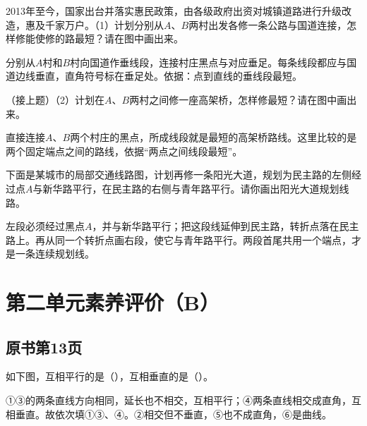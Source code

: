 2013年至今，国家出台并落实惠民政策，由各级政府出资对城镇道路进行升级改造，惠及千家万户。（1）计划分别从\(A\)、\(B\)两村出发各修一条公路与国道连接，怎样修能使修的路最短？请在图中画出来。\par
{}
\begin{BookAnswer}
分别从\(A\)村和\(B\)村向国道作垂线段，连接村庄黑点与对应垂足。每条线段都应与国道边线垂直，直角符号标在垂足处。依据：点到直线的垂线段最短。
\end{BookAnswer}

（接上题）（2）计划在\(A\)、\(B\)两村之间修一座高架桥，怎样修最短？请在图中画出来。\par
{}
\begin{BookAnswer}
直接连接\(A\)、\(B\)两个村庄的黑点，所成线段就是最短的高架桥路线。这里比较的是两个固定端点之间的路线，依据“两点之间线段最短”。
\end{BookAnswer}

下面是某城市的局部交通线路图，计划再修一条阳光大道，规划为民主路的左侧经过点\(A\)与新华路平行，在民主路的右侧与青年路平行。请你画出阳光大道规划线路。\par
{}
\begin{BookAnswer}
左段必须经过黑点\(A\)，并与新华路平行；把这段线延伸到民主路，转折点落在民主路上。再从同一个转折点画右段，使它与青年路平行。两段首尾共用一个端点，才是一条连续规划线。
\end{BookAnswer}


\section{第二单元素养评价（B）}



\subsection*{原书第13页}

如下图，互相平行的是（\hspace{1.8em}），互相垂直的是（\hspace{1.8em}）。\par
{}
\begin{BookAnswer}
①③的两条直线方向相同，延长也不相交，互相平行；④两条直线相交成直角，互相垂直。故依次填①③、④。②相交但不垂直，⑤也不成直角，⑥是曲线。
\end{BookAnswer}


